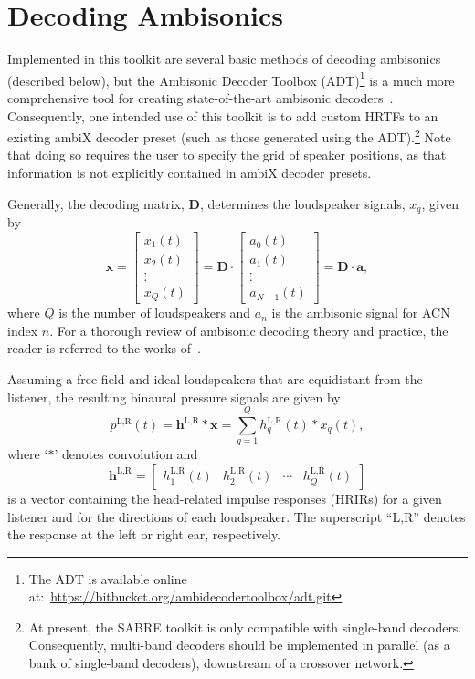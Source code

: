 \documentclass[11pt, oneside]{article}
\begin{document}
\section{Decoding Ambisonics}\label{sec:Decoding}
Implemented in this toolkit are several basic methods of decoding ambisonics (described below),
but the Ambisonic Decoder Toolbox (ADT)\footnote{The ADT is available online at:~\url{https://bitbucket.org/ambidecodertoolbox/adt.git}} is a much more comprehensive tool for creating state-of-the-art ambisonic decoders~\citep{Heller2012}.
Consequently, one intended use of this toolkit is to add custom HRTFs to an existing ambiX decoder preset (such as those generated using the ADT).\footnote{At present, the SABRE toolkit is only compatible with single-band decoders. Consequently, multi-band decoders should be implemented in parallel (as a bank of single-band decoders), downstream of a crossover network.}
Note that doing so requires the user to specify the grid of speaker positions, as that information is not explicitly contained in ambiX decoder presets.

Generally, the decoding matrix, $\mathbf{D}$, determines the loudspeaker signals, $x_q$, given by
\begin{equation}
\mathbf{x} = 
\begin{bmatrix}
x_{1}(t) \\ x_{2}(t) \\ \vdots \\ x_{Q}(t)
\end{bmatrix}
 = \mathbf{D} \cdot 
\begin{bmatrix}
a_{0}(t) \\ a_{1}(t) \\ \vdots \\ a_{N-1}(t)
\end{bmatrix}
 = \mathbf{D} \cdot \mathbf{a},
\end{equation}
where $Q$ is the number of loudspeakers and $a_n$ is the ambisonic signal for ACN index $n$.
For a thorough review of ambisonic decoding theory and practice,
the reader is referred to the works of~\citet{Heller2008,Heller2012}.

Assuming a free field and ideal loudspeakers that are equidistant from the listener,
the resulting binaural pressure signals are given by
\begin{equation}
p^{\text{L,R}}(t) = \mathbf{h}^{\text{L,R}} \ast \mathbf{x}
 = \sum_{q=1}^Q h_{q}^{\text{L,R}}(t) \ast x_{q}(t),
\end{equation}
where `$\ast$' denotes convolution and
\begin{equation}
\mathbf{h}^{\text{L,R}} = 
\begin{bmatrix}
h_{1}^{\text{L,R}}(t) & h_{2}^{\text{L,R}}(t) & \cdots & h_{Q}^{\text{L,R}}(t)
\end{bmatrix}
\end{equation}
is a vector containing the head-related impulse responses (HRIRs) for a given listener
and for the directions of each loudspeaker.
The superscript ``$\text{L,R}$'' denotes the response at the left or right ear, respectively.
\end{document}
